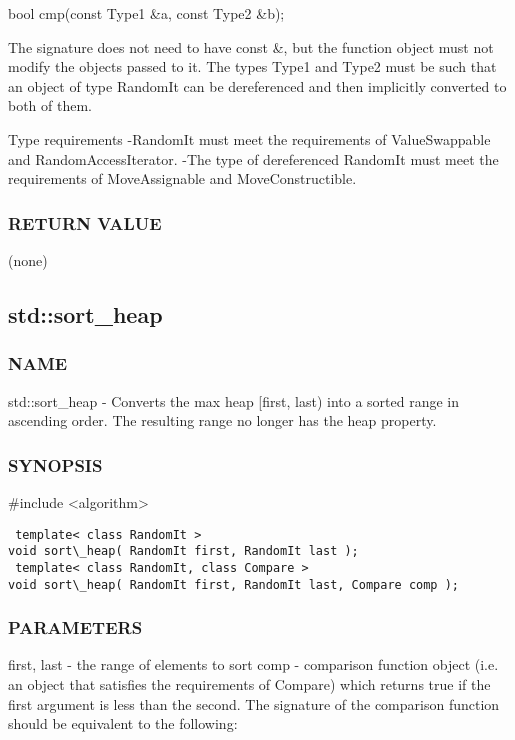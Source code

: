  bool cmp(const Type1 \&a, const Type2 \&b);

The signature does not need to have const \&, but the function object must not modify the objects passed to it.
The types Type1 and Type2 must be such that an object of type RandomIt can be dereferenced and then implicitly converted to both of them.

 Type requirements
 -RandomIt must meet the requirements of ValueSwappable and RandomAccessIterator.
 -The type of dereferenced RandomIt must meet the requirements of MoveAssignable and MoveConstructible.

\subsubsection{RETURN VALUE}
(none)



\subsection{std::sort\_heap}

\subsubsection{NAME}
std::sort\_heap - Converts the max heap [first, last) into a sorted range in ascending order. The resulting range no longer has the heap property.

\subsubsection{SYNOPSIS}
\#include <algorithm>

\begin{lstlisting}
 template< class RandomIt >
void sort\_heap( RandomIt first, RandomIt last );
 template< class RandomIt, class Compare >
void sort\_heap( RandomIt first, RandomIt last, Compare comp );
\end{lstlisting}

\subsubsection{PARAMETERS}
first, last - the range of elements to sort
comp - comparison function object (i.e. an object that satisfies the requirements of Compare) which returns true if the first argument is less than the second.
The signature of the comparison function should be equivalent to the following:

